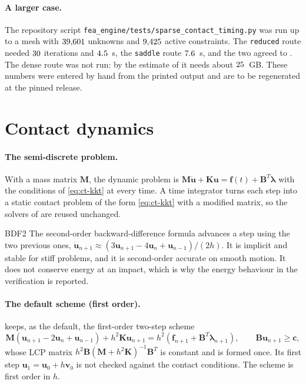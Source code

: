 \paragraph{A larger case.}
The repository script \texttt{fea\_engine/tests/sparse\_contact\_timing.py} was run up to a mesh with $39{,}601$ unknowns and $9{,}425$ active constraints. The \texttt{reduced} route needed $30$ iterations and $4.5$~s, the \texttt{saddle} route $7.6$~s, and the two agreed to \ctcAuthDiff. The dense route was not run: by the estimate of  it needs about $25$~GB. These numbers were entered by hand from the printed output and are to be regenerated at the pinned release.

\section{Contact dynamics}\label{sec:ct-dyn}

\paragraph{The semi-discrete problem.}
With a mass matrix $\bm M$, the dynamic problem is $\bm M\ddot{\bm u}+\bm K\bm u=\bm f(t)+\bm B^T\bm\lambda$ with the conditions of \eqref{eq:ct-kkt} at every time. A time integrator turns each step into a static contact problem of the form \eqref{eq:ct-kkt} with a modified matrix, so the solvers of  are reused unchanged.

\begin{sidenote}{BDF2}
The second-order backward-difference formula advances a step using the two previous ones, $\dot{\bm u}_{n+1}\approx(3\bm u_{n+1}-4\bm u_n+\bm u_{n-1})/(2h)$. It is implicit and stable for stiff problems, and it is second-order accurate on smooth motion. It does not conserve energy at an impact, which is why the energy behaviour in the verification is reported.
\end{sidenote}

\paragraph{The default scheme (first order).}
\fea{} keeps, as the default, the first-order two-step scheme
\begin{equation}\label{eq:ct-twostep}
\bm M(\bm u_{n+1}-2\bm u_n+\bm u_{n-1})+h^2\bm K\bm u_{n+1}=h^2(\bm f_{n+1}+\bm B^T\bm\lambda_{n+1}),\qquad \bm B\bm u_{n+1}\ge\bm c ,
\end{equation}
whose LCP matrix $h^2\bm B(\bm M+h^2\bm K)^{-1}\bm B^T$ is constant and is formed once. Its first step $\bm u_1=\bm u_0+h\bm v_0$ is not checked against the contact conditions. The scheme is first order in $h$.

